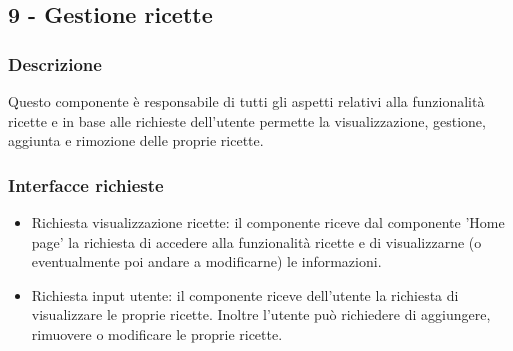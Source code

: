 \documentclass[a4paper,12pt]{article}
\begin{document}
\subsection*{9 -  Gestione ricette}
\subsubsection*{Descrizione}
Questo componente è responsabile di tutti gli aspetti relativi alla funzionalità ricette e in base alle richieste dell'utente permette la visualizzazione, gestione, aggiunta e rimozione delle proprie ricette.
\subsubsection*{Interfacce richieste}
\begin{itemize} \setlength\itemsep{0.01em}.
\item {\sffamily Richiesta visualizzazione ricette}: il componente riceve dal componente 'Home page'  la richiesta di accedere alla funzionalità ricette e di visualizzarne (o eventualmente poi andare a modificarne) le informazioni.
\item {\sffamily Richiesta input utente}: il componente riceve dell'utente la richiesta di visualizzare le proprie ricette. Inoltre l'utente può richiedere di aggiungere, rimuovere o modificare le proprie ricette.

\end{itemize}
\end{document}
